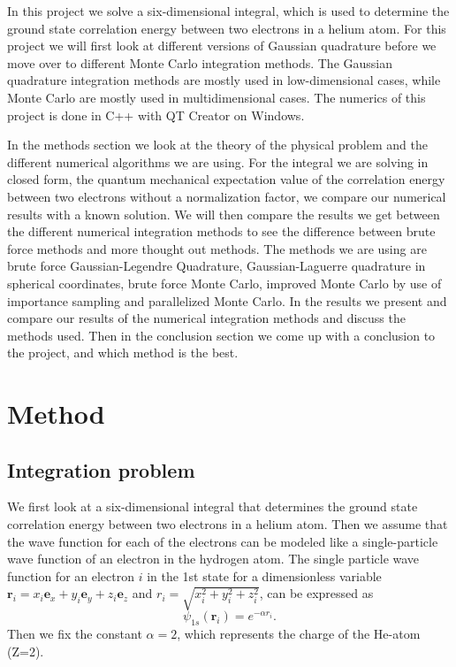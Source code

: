 \documentclass[12pt,a4paper,english]{article}
\begin{document}
In this project we solve a six-dimensional integral, which is used to determine the ground state correlation energy between two electrons in a helium atom. For this project we will first look at different versions of Gaussian quadrature before we move over to different Monte Carlo integration methods. The Gaussian quadrature integration methods are mostly used in low-dimensional cases, while Monte Carlo are mostly used in multidimensional cases. The numerics of this project is done in C++ with QT Creator on Windows.

In the methods section we look at the theory of the physical problem and the different numerical algorithms we are using. For the integral we are solving in closed form, the quantum mechanical expectation value of the correlation energy between two electrons without a normalization factor, we compare our numerical results with a known solution. We will then compare the results we get between the different numerical integration methods to see the difference between brute force methods and more thought out methods. The methods we are using are brute force Gaussian-Legendre Quadrature, Gaussian-Laguerre quadrature in spherical coordinates, brute force Monte Carlo, improved Monte Carlo by use of importance sampling and parallelized Monte Carlo. In the results we present and compare our results of the numerical integration methods and discuss the methods used. Then in the conclusion section we come up with a conclusion to the project, and which method is the best.

\section{Method}
\subsection{Integration problem}
We first look at a six-dimensional integral that determines the ground state correlation energy between two electrons in a helium atom. Then we assume that the wave function for each of the electrons can be modeled like a single-particle wave function of an electron in the hydrogen atom. The single particle wave function for an electron $i$ in the 1st state for a dimensionless variable $\textbf{r}_i=x_i\textbf{e}_x+y_i\textbf{e}_y+z_i\textbf{e}_z$ and $r_i=\sqrt{x_i^2+y_i^2+z_i^2}$, can be expressed as 
\begin{equation}
\label{eq:wave_func}
\psi_{1s}(\textbf{r}_i)=e^{-\alpha r_i}.
\end{equation}
Then we fix the constant $\alpha=2$, which represents the charge of the He-atom (Z=2). 
\end{document}
